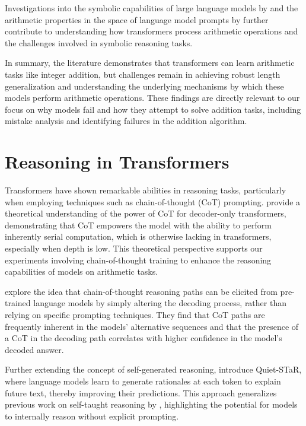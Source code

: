 Investigations into the symbolic capabilities of large language models by \cite{dave_investigating_2024} and the arithmetic properties in the space of language model prompts by \cite{krubinski_basic_2023} further contribute to understanding how transformers process arithmetic operations and the challenges involved in symbolic reasoning tasks.

In summary, the literature demonstrates that transformers can learn arithmetic tasks like integer addition, but challenges remain in achieving robust length generalization and understanding the underlying mechanisms by which these models perform arithmetic operations. These findings are directly relevant to our focus on why models fail and how they attempt to solve addition tasks, including mistake analysis and identifying failures in the addition algorithm.

\section{Reasoning in Transformers}\label{sota_reasoning_in_transformers}

Transformers have shown remarkable abilities in reasoning tasks, particularly when employing techniques such as chain-of-thought (CoT) prompting. \cite{li_chain_2024} provide a theoretical understanding of the power of CoT for decoder-only transformers, demonstrating that CoT empowers the model with the ability to perform inherently serial computation, which is otherwise lacking in transformers, especially when depth is low. This theoretical perspective supports our experiments involving chain-of-thought training to enhance the reasoning capabilities of models on arithmetic tasks.

\cite{wang_cot_2024} explore the idea that chain-of-thought reasoning paths can be elicited from pre-trained language models by simply altering the decoding process, rather than relying on specific prompting techniques. They find that CoT paths are frequently inherent in the models' alternative sequences and that the presence of a CoT in the decoding path correlates with higher confidence in the model's decoded answer.

Further extending the concept of self-generated reasoning, \cite{zelikman_quiet-star_2024} introduce Quiet-STaR, where language models learn to generate rationales at each token to explain future text, thereby improving their predictions. This approach generalizes previous work on self-taught reasoning by \cite{zelikman_star_2022}, highlighting the potential for models to internally reason without explicit prompting.


